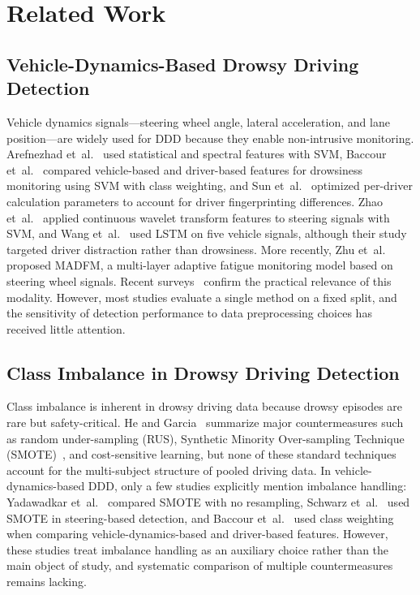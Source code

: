 \documentclass[lettersize,journal]{IEEEtran}
\begin{document}
\section{Related Work}
\label{sec:related}

\subsection{Vehicle-Dynamics-Based Drowsy Driving Detection}
Vehicle dynamics signals---steering wheel angle, lateral acceleration, and lane position---are widely used for DDD because they enable non-intrusive monitoring.
Arefnezhad et~al.~\cite{arefnezhad2019} used statistical and spectral features with SVM, Baccour et~al.~\cite{baccour2022} compared vehicle-based and driver-based features for drowsiness monitoring using SVM with class weighting, and Sun et~al.~\cite{sun2021} optimized per-driver calculation parameters to account for driver fingerprinting differences.
Zhao et~al.~\cite{zhao2012} applied continuous wavelet transform features to steering signals with SVM, and Wang et~al.~\cite{wang2022} used LSTM on five vehicle signals, although their study targeted driver distraction rather than drowsiness.
More recently, Zhu et~al.~\cite{zhu2025} proposed MADFM, a multi-layer adaptive fatigue monitoring model based on steering wheel signals.
Recent surveys~\cite{fu2024,fonseca2025,alquraishi2024,perkins2022} confirm the practical relevance of this modality.
However, most studies evaluate a single method on a fixed split, and the sensitivity of detection performance to data preprocessing choices has received little attention.

\subsection{Class Imbalance in Drowsy Driving Detection}
Class imbalance is inherent in drowsy driving data because drowsy episodes are rare but safety-critical.
He and Garcia~\cite{he2009} summarize major countermeasures such as random under-sampling (RUS), Synthetic Minority Over-sampling Technique (SMOTE)~\cite{chawla2002}, and cost-sensitive learning, but none of these standard techniques account for the multi-subject structure of pooled driving data.
In vehicle-dynamics-based DDD, only a few studies explicitly mention imbalance handling: Yadawadkar et~al.~\cite{yadawadkar2018} compared SMOTE with no resampling, Schwarz et~al.~\cite{schwarz2019} used SMOTE in steering-based detection, and Baccour et~al.~\cite{baccour2022} used class weighting when comparing vehicle-dynamics-based and driver-based features.
However, these studies treat imbalance handling as an auxiliary choice rather than the main object of study, and systematic comparison of multiple countermeasures remains lacking.
\end{document}
